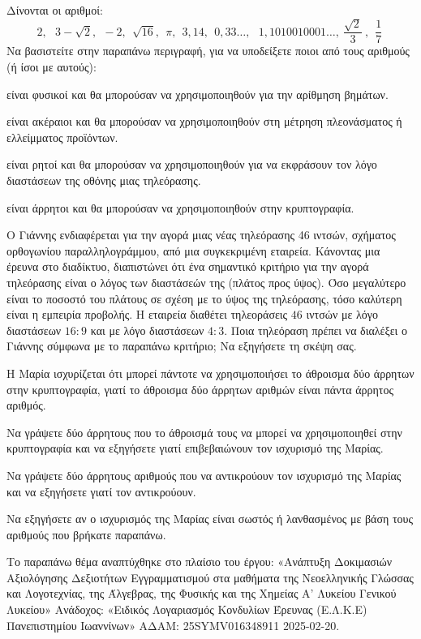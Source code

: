 \begin{alist}
\item Δίνονται οι αριθμοί:
\begin{equation*}2,\ \ \ 3 - \sqrt{2},\ \  - 2,\ \ \sqrt{16},\ \ \pi,\ \ 3,14,\ \ 0,33\ldots,\ \ \ 1,1010010001\ldots,\ \dfrac{\sqrt{2}}{3}\ ,\ \ \dfrac{1}{7}\ \end{equation*}
Να βασιστείτε στην παραπάνω περιγραφή, για να υποδείξετε ποιοι από τους αριθμούς (ή ίσοι με αυτούς):
\begin{rlist}
\item
  είναι φυσικοί και θα μπορούσαν να χρησιμοποιηθούν για την αρίθμηση βημάτων.
\item
  είναι ακέραιοι και θα μπορούσαν να χρησιμοποιηθούν στη μέτρηση πλεονάσματος ή ελλείμματος προϊόντων.
\item
  είναι ρητοί και θα μπορούσαν να χρησιμοποιηθούν για να εκφράσουν τον λόγο διαστάσεων της οθόνης μιας τηλεόρασης.
\item είναι άρρητοι και θα μπορούσαν να χρησιμοποιηθούν στην κρυπτογραφία.
\end{rlist}
\item Ο Γιάννης ενδιαφέρεται για την αγορά μιας νέας τηλεόρασης 46 ιντσών, σχήματος ορθογωνίου παραλληλογράμμου, από μια συγκεκριμένη εταιρεία. Κάνοντας μια έρευνα στο διαδίκτυο, διαπιστώνει ότι ένα σημαντικό κριτήριο για την αγορά τηλεόρασης είναι ο λόγος των διαστάσεών της (πλάτος προς ύψος). Όσο μεγαλύτερο είναι το ποσοστό του πλάτους σε σχέση με το ύψος της τηλεόρασης, τόσο καλύτερη είναι η εμπειρία προβολής. Η εταιρεία διαθέτει τηλεοράσεις $46$ ιντσών με λόγο διαστάσεων $16:9$ και με λόγο διαστάσεων $4:3$. Ποια τηλεόραση πρέπει να διαλέξει ο Γιάννης σύμφωνα με το παραπάνω κριτήριο; Να εξηγήσετε τη σκέψη σας.
\item Η Μαρία ισχυρίζεται ότι μπορεί πάντοτε να χρησιμοποιήσει το άθροισμα δύο άρρητων στην κρυπτογραφία, γιατί το άθροισμα δύο άρρητων αριθμών είναι πάντα άρρητος αριθμός.
\begin{rlist}
\item Να γράψετε δύο άρρητους που το άθροισμά τους να μπορεί να χρησιμοποιηθεί στην κρυπτογραφία και να εξηγήσετε γιατί επιβεβαιώνουν τον ισχυρισμό της Μαρίας.
\item Να γράψετε δύο άρρητους αριθμούς που να αντικρούουν τον ισχυρισμό της Μαρίας και να εξηγήσετε γιατί τον αντικρούουν.
\item Να εξηγήσετε αν ο ισχυρισμός της Μαρίας είναι σωστός ή λανθασμένος με βάση τους αριθμούς που βρήκατε παραπάνω.
\end{rlist}
\end{alist}
{\footnotesize Το παραπάνω θέμα αναπτύχθηκε στο πλαίσιο του έργου: «Ανάπτυξη Δοκιμασιών Αξιολόγησης Δεξιοτήτων Εγγραμματισμού στα μαθήματα της Νεοελληνικής Γλώσσας και Λογοτεχνίας, της Άλγεβρας, της Φυσικής και της Χημείας Α' Λυκείου Γενικού Λυκείου» Ανάδοχος: «Ειδικός Λογαριασμός Κονδυλίων Έρευνας (Ε.Λ.Κ.Ε) Πανεπιστημίου Ιωαννίνων» ΑΔΑΜ: 25SYMV016348911 2025-02-20.}

